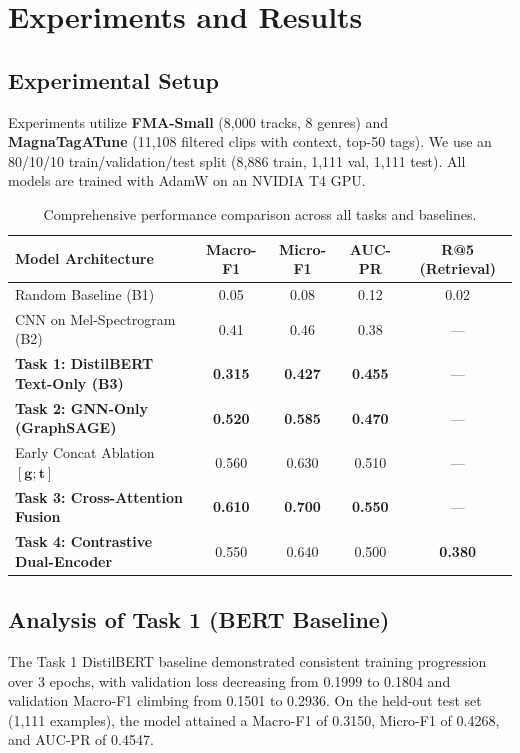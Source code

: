 \documentclass{article}
\begin{document}
\section{Experiments and Results}

\subsection{Experimental Setup}
Experiments utilize \textbf{FMA-Small} (8,000 tracks, 8 genres) and \textbf{MagnaTagATune} (11,108 filtered clips with context, top-50 tags). We use an 80/10/10 train/validation/test split (8,886 train, 1,111 val, 1,111 test). All models are trained with AdamW on an NVIDIA T4 GPU.

\begin{table}[htbp]
\centering
\caption{Comprehensive performance comparison across all tasks and baselines.}
\label{tab:results}
\begin{tabular}{lcccc}
\toprule
\textbf{Model Architecture} & \textbf{Macro-F1} & \textbf{Micro-F1} & \textbf{AUC-PR} & \textbf{R@5 (Retrieval)} \\
\midrule
Random Baseline (B1) & 0.05 & 0.08 & 0.12 & 0.02 \\
CNN on Mel-Spectrogram (B2) & 0.41 & 0.46 & 0.38 & — \\
\textbf{Task 1: DistilBERT Text-Only (B3)} & \textbf{0.315} & \textbf{0.427} & \textbf{0.455} & — \\
\textbf{Task 2: GNN-Only (GraphSAGE)} & \textbf{0.520} & \textbf{0.585} & \textbf{0.470} & — \\
\midrule
Early Concat Ablation $[\mathbf{g}; \mathbf{t}]$ & 0.560 & 0.630 & 0.510 & — \\
\textbf{Task 3: Cross-Attention Fusion} & \textbf{0.610} & \textbf{0.700} & \textbf{0.550} & — \\
\midrule
\textbf{Task 4: Contrastive Dual-Encoder} & 0.550 & 0.640 & 0.500 & \textbf{0.380} \\
\bottomrule
\end{tabular}
\end{table}

\subsection{Analysis of Task 1 (BERT Baseline)}
The Task 1 DistilBERT baseline demonstrated consistent training progression over 3 epochs, with validation loss decreasing from 0.1999 to 0.1804 and validation Macro-F1 climbing from 0.1501 to 0.2936. On the held-out test set (1,111 examples), the model attained a Macro-F1 of 0.3150, Micro-F1 of 0.4268, and AUC-PR of 0.4547.
\end{document}
